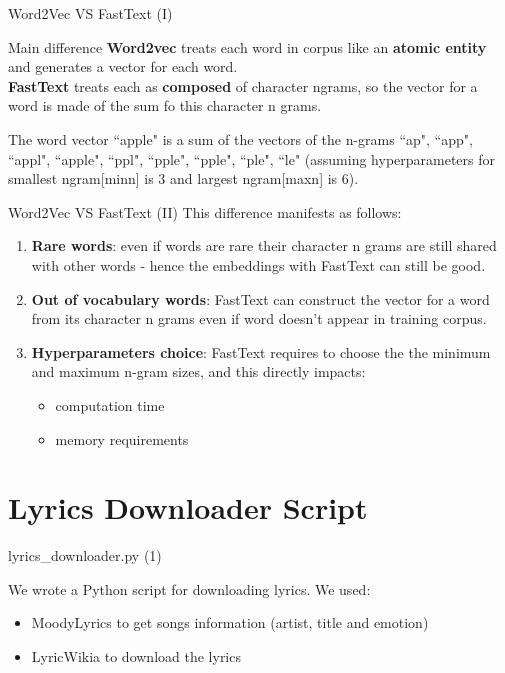 \documentclass[xcolor=dvipsnames]{beamer}
\begin{document}
\begin{frame}{Word2Vec VS FastText (I)}
\begin{block}{Main difference}
\textbf{Word2vec} treats each word in corpus like an \textbf{atomic entity} and generates a vector for each word.\\
\textbf{FastText} treats each as \textbf{composed} of character ngrams, so the vector for a word is made of the sum fo this character n grams.
\end{block}
\begin{Example}
 The word vector ``apple" is a sum of the vectors of the n-grams ``ap", ``app", ``appl", ``apple", ``ppl", ``pple", ``pple", ``ple", ``le" (assuming hyperparameters for smallest ngram[minn] is 3 and largest ngram[maxn] is 6).
\end{Example}
\end{frame}
\begin{frame}{Word2Vec VS FastText (II)}
This difference manifests as follows:
\begin{enumerate}
\item \textbf{Rare words}: even if words are rare their character n grams are still shared with other words - hence the embeddings with FastText can still be good.
\item \textbf{Out of vocabulary words}: FastText can construct the vector for a word from its character n grams even if word doesn't appear in training corpus.
\item \textbf{Hyperparameters choice}: FastText requires to choose the the minimum and maximum n-gram sizes, and this directly impacts:
	\begin{itemize}
	\item computation time
	\item memory requirements
	\end{itemize}

\end{enumerate}
\end{frame}

\section{Lyrics Downloader Script}
\begin{frame}{lyrics\_downloader.py (1)}

We wrote a Python script for downloading lyrics. We used:
\begin{itemize}
\item MoodyLyrics to get songs information (artist, title and emotion)
\item LyricWikia to download the lyrics
\end{itemize}

\end{frame}
\end{document}
